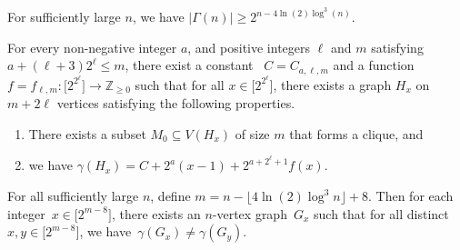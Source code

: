 \documentclass[10pt,a4paper]{amsart}
\begin{document}
\begin{theorem}
\label{thm:main}
    For sufficiently large $n$, we have $|\Gamma(n)| \geq 2^{n-4\ln(2)\log^3(n)}$.
\end{theorem}

\begin{lemma}\label{q2}

For every non-negative integer $a$, and positive integers $\ell$ and $m$ satisfying $a + (\ell+3)2^\ell\leq m$, there exist a constant~ $C = C_{a,\ell,m}$ and a function~$f = f_{\ell,m}\colon \bigl[2^{2^\ell}\bigr]\to \mathbb{Z}_{\ge 0}$ such that for all $x
\in \bigl[2^{2^\ell}\bigr]$, there exists a graph $H_x$ on $m + 2\ell$ vertices satisfying the following properties.

\begin{enumerate}
    \item There exists a subset $M_0\subseteq V(H_x)$ of size $m$ that forms a clique, and 
    \item we have $\gamma(H_x)=C + 2^a (x-1) + 2^{a+2^\ell+1}f(x)$. \label{clique_number}
\end{enumerate}
\end{lemma}

\begin{theorem}
    For all sufficiently large $n$, define $m = n-\lfloor 4\ln(2)\log^3n\rfloor +8$. Then for each integer~$x \in \bigl[2^{m-8}\bigr]$, there exists an $n$-vertex graph~$G_x$ such that for all distinct~$x, y\in \bigl[2^{m-8}\bigr]$, we have~$\gamma(G_x)\neq \gamma(G_y)$. 
\end{theorem}
\end{document}
